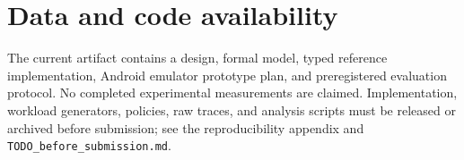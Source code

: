 \documentclass[preprint,12pt,authoryear]{elsarticle}
\theoremstyle{remark}
\begin{document}
\section*{Data and code availability}
The current artifact contains a design, formal model, typed reference implementation, Android emulator prototype plan, and preregistered evaluation protocol. No completed experimental measurements are claimed. Implementation, workload generators, policies, raw traces, and analysis scripts must be released or archived before submission; see the reproducibility appendix and \texttt{TODO\_before\_submission.md}.



\end{document}
